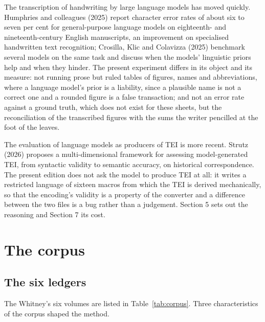 \documentclass[11pt]{article}
\begin{document}
The transcription of handwriting by large language models has moved quickly. Humphries and colleagues (2025) report character error rates of about six to seven per cent for general-purpose language models on eighteenth- and nineteenth-century English manuscripts, an improvement on specialised handwritten text recognition; Crosilla, Klic and Colavizza (2025) benchmark several models on the same task and discuss when the models' linguistic priors help and when they hinder. The present experiment differs in its object and its measure: not running prose but ruled tables of figures, names and abbreviations, where a language model's prior is a liability, since a plausible name is not a correct one and a rounded figure is a false transaction; and not an error rate against a ground truth, which does not exist for these sheets, but the reconciliation of the transcribed figures with the sums the writer pencilled at the foot of the leaves.

The evaluation of language models as producers of TEI is more recent. Strutz (2026) proposes a multi-dimensional framework for assessing model-generated TEI, from syntactic validity to semantic accuracy, on historical correspondence. The present edition does not ask the model to produce TEI at all: it writes a restricted language of sixteen macros from which the TEI is derived mechanically, so that the encoding's validity is a property of the converter and a difference between the two files is a bug rather than a judgement. Section 5 sets out the reasoning and Section 7 its cost.

\section{The corpus}

\subsection{The six ledgers}

The Whitney's six volumes are listed in Table~\ref{tab:corpus}. Three characteristics of the corpus shaped the method.
\end{document}
